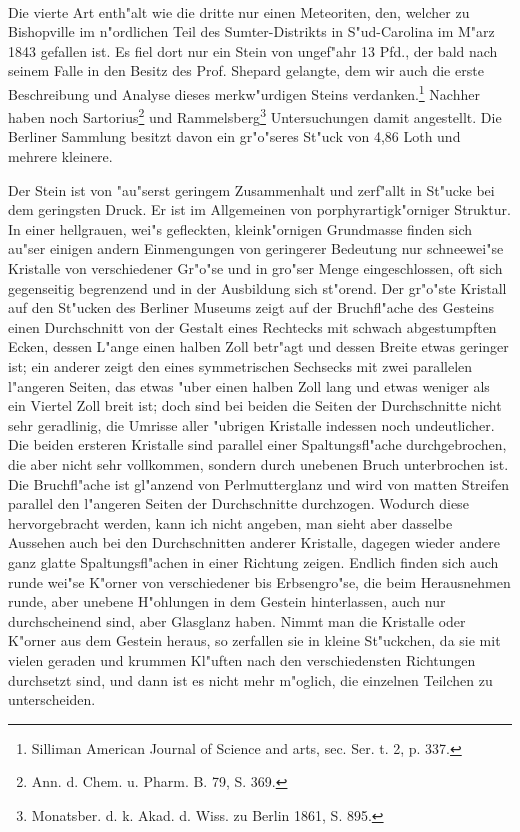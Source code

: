 \documentclass[a4paper, 11pt, oneside]{article}
\begin{document}
\paragraph{}
Die vierte Art enth"alt wie die dritte nur einen Meteoriten, den, welcher zu Bishopville im n"ordlichen Teil des Sumter-Distrikts in S"ud-Carolina im M"arz 1843 gefallen ist. Es fiel dort nur ein Stein von ungef"ahr 13 Pfd., der bald nach seinem Falle in den Besitz des Prof. Shepard gelangte, dem wir auch die erste Beschreibung und Analyse dieses merkw"urdigen Steins verdanken.\footnote{Silliman American Journal of Science and arts, sec. Ser. t. 2, p. 337.} Nachher haben noch Sartorius\footnote{Ann. d. Chem. u. Pharm. B. 79, S. 369.} und Rammelsberg\footnote{Monatsber. d. k. Akad. d. Wiss. zu Berlin 1861, S. 895.} Untersuchungen damit angestellt. Die Berliner Sammlung besitzt davon ein gr"o"seres St"uck von 4,86 Loth und mehrere kleinere.

Der Stein ist von "au"serst geringem Zusammenhalt und zerf"allt in St"ucke bei dem geringsten Druck. Er ist im Allgemeinen von porphyrartigk"orniger Struktur. In einer hellgrauen, wei"s gefleckten, kleink"ornigen Grundmasse finden sich au"ser einigen andern Einmengungen von geringerer Bedeutung nur schneewei"se Kristalle von verschiedener Gr"o"se und in gro"ser Menge eingeschlossen, oft sich gegenseitig begrenzend und in der Ausbildung sich st"orend. Der gr"o"ste Kristall auf den St"ucken des Berliner Museums zeigt auf der Bruchfl"ache des Gesteins einen Durchschnitt von der Gestalt eines Rechtecks mit schwach abgestumpften Ecken, dessen L"ange einen halben Zoll betr"agt und dessen Breite etwas geringer ist; ein anderer zeigt den eines symmetrischen Sechsecks mit zwei parallelen l"angeren Seiten, das etwas "uber einen halben Zoll lang und etwas weniger als ein Viertel Zoll breit ist; doch sind bei beiden die Seiten der Durchschnitte nicht sehr geradlinig, die Umrisse aller "ubrigen Kristalle indessen noch undeutlicher. Die beiden ersteren Kristalle sind parallel einer Spaltungsfl"ache durchgebrochen, die aber nicht sehr vollkommen, sondern durch unebenen Bruch unterbrochen ist. Die Bruchfl"ache ist gl"anzend von Perlmutterglanz und wird von matten Streifen parallel den l"angeren Seiten der Durchschnitte durchzogen. Wodurch diese hervorgebracht werden, kann ich nicht angeben, man sieht aber dasselbe Aussehen auch bei den Durchschnitten anderer Kristalle, dagegen wieder andere ganz glatte Spaltungsfl"achen in einer Richtung zeigen. Endlich finden sich auch runde wei"se K"orner von verschiedener bis Erbsengro"se, die beim Herausnehmen runde, aber unebene H"ohlungen in dem Gestein hinterlassen, auch nur durchscheinend sind, aber Glasglanz haben. Nimmt man die Kristalle oder K"orner aus dem Gestein heraus, so zerfallen sie in kleine St"uckchen, da sie mit vielen geraden und krummen Kl"uften nach den verschiedensten Richtungen durchsetzt sind, und dann ist es nicht mehr m"oglich, die einzelnen Teilchen zu unterscheiden.
\end{document}
